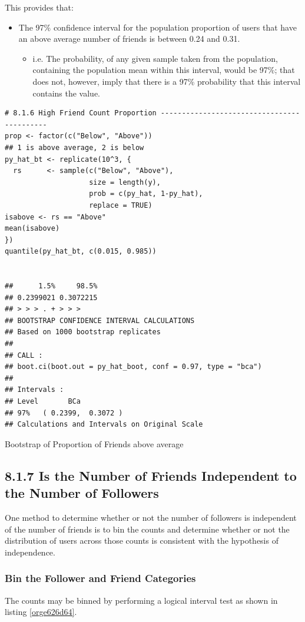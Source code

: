 \documentclass[11pt]{article}
\begin{document}
This provides that:
\begin{itemize}
\item The 97\% confidence interval for the population proportion of users that have
an above average number of friends is between 0.24 and 0.31.
\begin{itemize}
\item i.e. The probability, of any given sample taken from the population,
containing the population mean within this interval, would be 97\%; that does
not, however, imply that there is a 97\% probability that this interval
contains the value.
\end{itemize}
\end{itemize}

\begin{listing}[htbp]
\begin{verbatim}
# 8.1.6 High Friend Count Proportion -------------------------------------------
prop <- factor(c("Below", "Above"))
## 1 is above average, 2 is below
py_hat_bt <- replicate(10^3, {
  rs      <- sample(c("Below", "Above"),
                    size = length(y),
                    prob = c(py_hat, 1-py_hat),
                    replace = TRUE)
isabove <- rs == "Above"
mean(isabove)
})
quantile(py_hat_bt, c(0.015, 0.985))


##      1.5%     98.5%
## 0.2399021 0.3072215
## > > > . + > > >
## BOOTSTRAP CONFIDENCE INTERVAL CALCULATIONS
## Based on 1000 bootstrap replicates
##
## CALL :
## boot.ci(boot.out = py_hat_boot, conf = 0.97, type = "bca")
##
## Intervals :
## Level       BCa
## 97%   ( 0.2399,  0.3072 )
## Calculations and Intervals on Original Scale
\end{verbatim}
\caption{\label{org1167ee9}Bootstrap of Proportion of Friends above average}
\end{listing}
\subsection{8.1.7 Is the Number of Friends Independent to the Number of Followers}
\label{sec:org903343d}
One method to determine whether or not the number of followers is independent of the number of friends is to bin the counts and determine whether or not the distribution of users across those counts is consistent with the hypothesis of independence.

\subsubsection{Bin the Follower and Friend Categories}
\label{sec:org8e2888c}
The counts may be binned by performing a logical interval test as shown in listing \ref{orge626d64}.
\end{document}
